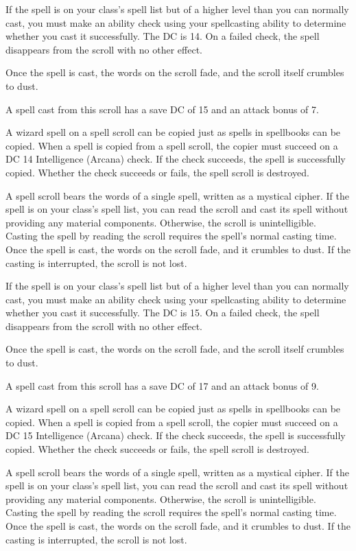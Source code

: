 \documentclass[10pt,a4paper,twoside,bg=print,twocolumn,openany,nodeprecatedcode]{dndbook}
\begin{document}
If the spell is on your class's spell list but of a higher level than you can normally cast, you must make an ability check using your spellcasting ability to determine whether you cast it successfully. The DC is 14. On a failed check, the spell disappears from the scroll with no other effect.

Once the spell is cast, the words on the scroll fade, and the scroll itself crumbles to dust.

A spell cast from this scroll has a save DC of 15 and an attack bonus of 7.

A wizard spell on a spell scroll can be copied just as spells in spellbooks can be copied. When a spell is copied from a spell scroll, the copier must succeed on a DC 14 Intelligence (Arcana) check. If the check succeeds, the spell is successfully copied. Whether the check succeeds or fails, the spell scroll is destroyed.

A spell scroll bears the words of a single spell, written as a mystical cipher. If the spell is on your class's spell list, you can read the scroll and cast its spell without providing any material components. Otherwise, the scroll is unintelligible. Casting the spell by reading the scroll requires the spell's normal casting time. Once the spell is cast, the words on the scroll fade, and it crumbles to dust. If the casting is interrupted, the scroll is not lost.

If the spell is on your class's spell list but of a higher level than you can normally cast, you must make an ability check using your spellcasting ability to determine whether you cast it successfully. The DC is 15. On a failed check, the spell disappears from the scroll with no other effect.

Once the spell is cast, the words on the scroll fade, and the scroll itself crumbles to dust.

A spell cast from this scroll has a save DC of 17 and an attack bonus of 9.

A wizard spell on a spell scroll can be copied just as spells in spellbooks can be copied. When a spell is copied from a spell scroll, the copier must succeed on a DC 15 Intelligence (Arcana) check. If the check succeeds, the spell is successfully copied. Whether the check succeeds or fails, the spell scroll is destroyed.

A spell scroll bears the words of a single spell, written as a mystical cipher. If the spell is on your class's spell list, you can read the scroll and cast its spell without providing any material components. Otherwise, the scroll is unintelligible. Casting the spell by reading the scroll requires the spell's normal casting time. Once the spell is cast, the words on the scroll fade, and it crumbles to dust. If the casting is interrupted, the scroll is not lost.
\end{document}
